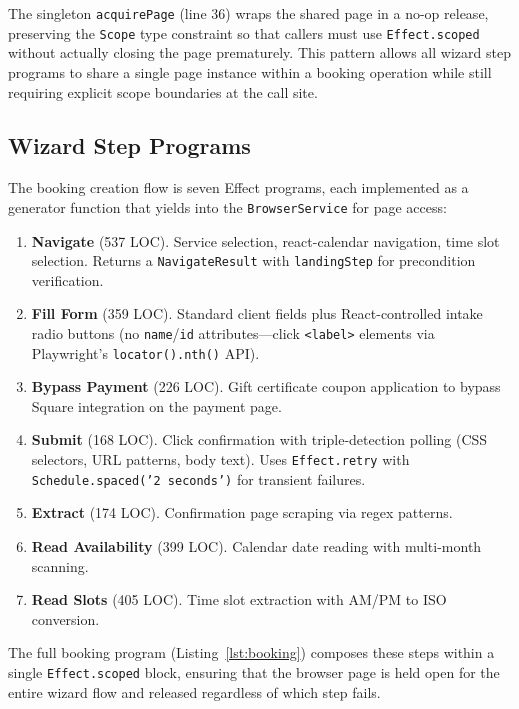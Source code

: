 \documentclass[conference]{IEEEtran}
\begin{document}
The singleton \texttt{acquirePage} (line 36) wraps the shared page in a no-op release, preserving the \texttt{Scope} type constraint so that callers must use \texttt{Effect.scoped} without actually closing the page prematurely. This pattern allows all wizard step programs to share a single page instance within a booking operation while still requiring explicit scope boundaries at the call site.

\subsection{Wizard Step Programs}

The booking creation flow is seven Effect programs, each implemented as a generator function that yields into the \texttt{BrowserService} for page access:

\begin{enumerate}
\item \textbf{Navigate} (537 LOC). Service selection, react-calendar navigation, time slot selection. Returns a \texttt{NavigateResult} with \texttt{landingStep} for precondition verification.
\item \textbf{Fill Form} (359 LOC). Standard client fields plus React-controlled intake radio buttons (no \texttt{name}/\texttt{id} attributes---click \texttt{<label>} elements via Playwright's \texttt{locator().nth()} API).
\item \textbf{Bypass Payment} (226 LOC). Gift certificate coupon application to bypass Square integration on the payment page.
\item \textbf{Submit} (168 LOC). Click confirmation with triple-detection polling (CSS selectors, URL patterns, body text). Uses \texttt{Effect.retry} with \texttt{Schedule.spaced('2 seconds')} for transient failures.
\item \textbf{Extract} (174 LOC). Confirmation page scraping via regex patterns.
\item \textbf{Read Availability} (399 LOC). Calendar date reading with multi-month scanning.
\item \textbf{Read Slots} (405 LOC). Time slot extraction with AM/PM to ISO conversion.
\end{enumerate}

The full booking program (Listing~\ref{lst:booking}) composes these steps within a single \texttt{Effect.scoped} block, ensuring that the browser page is held open for the entire wizard flow and released regardless of which step fails.
\end{document}
